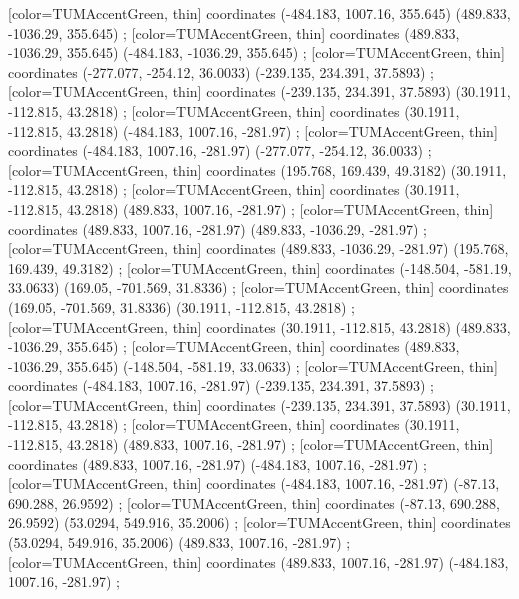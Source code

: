         [color=TUMAccentGreen, thin] coordinates { (-484.183, 1007.16, 355.645) (489.833, -1036.29, 355.645) };
        [color=TUMAccentGreen, thin] coordinates { (489.833, -1036.29, 355.645) (-484.183, -1036.29, 355.645) };
        [color=TUMAccentGreen, thin] coordinates { (-277.077, -254.12, 36.0033) (-239.135, 234.391, 37.5893) };
        [color=TUMAccentGreen, thin] coordinates { (-239.135, 234.391, 37.5893) (30.1911, -112.815, 43.2818) };
        [color=TUMAccentGreen, thin] coordinates { (30.1911, -112.815, 43.2818) (-484.183, 1007.16, -281.97) };
        [color=TUMAccentGreen, thin] coordinates { (-484.183, 1007.16, -281.97) (-277.077, -254.12, 36.0033) };
        [color=TUMAccentGreen, thin] coordinates { (195.768, 169.439, 49.3182) (30.1911, -112.815, 43.2818) };
        [color=TUMAccentGreen, thin] coordinates { (30.1911, -112.815, 43.2818) (489.833, 1007.16, -281.97) };
        [color=TUMAccentGreen, thin] coordinates { (489.833, 1007.16, -281.97) (489.833, -1036.29, -281.97) };
        [color=TUMAccentGreen, thin] coordinates { (489.833, -1036.29, -281.97) (195.768, 169.439, 49.3182) };
        [color=TUMAccentGreen, thin] coordinates { (-148.504, -581.19, 33.0633) (169.05, -701.569, 31.8336) };
        [color=TUMAccentGreen, thin] coordinates { (169.05, -701.569, 31.8336) (30.1911, -112.815, 43.2818) };
        [color=TUMAccentGreen, thin] coordinates { (30.1911, -112.815, 43.2818) (489.833, -1036.29, 355.645) };
        [color=TUMAccentGreen, thin] coordinates { (489.833, -1036.29, 355.645) (-148.504, -581.19, 33.0633) };
        [color=TUMAccentGreen, thin] coordinates { (-484.183, 1007.16, -281.97) (-239.135, 234.391, 37.5893) };
        [color=TUMAccentGreen, thin] coordinates { (-239.135, 234.391, 37.5893) (30.1911, -112.815, 43.2818) };
        [color=TUMAccentGreen, thin] coordinates { (30.1911, -112.815, 43.2818) (489.833, 1007.16, -281.97) };
        [color=TUMAccentGreen, thin] coordinates { (489.833, 1007.16, -281.97) (-484.183, 1007.16, -281.97) };
        [color=TUMAccentGreen, thin] coordinates { (-484.183, 1007.16, -281.97) (-87.13, 690.288, 26.9592) };
        [color=TUMAccentGreen, thin] coordinates { (-87.13, 690.288, 26.9592) (53.0294, 549.916, 35.2006) };
        [color=TUMAccentGreen, thin] coordinates { (53.0294, 549.916, 35.2006) (489.833, 1007.16, -281.97) };
        [color=TUMAccentGreen, thin] coordinates { (489.833, 1007.16, -281.97) (-484.183, 1007.16, -281.97) };
